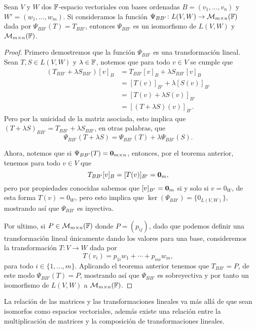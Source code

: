 \begin{teor}\label{teo:isomTrMat}
  Sean $V$ y $W$ dos $\mathbb{F}$-espacio vectoriales con bases ordenadas $B = (v_1,\ldots,v_n)$ y $W' = (w_1,\ldots,w_m)$. Si consideramos la función $\Psi_{BB'}\colon L(V,W) \to \mathcal{M}_{m\times n}(\mathbb{F})$ dada por $\Psi_{BB'}(T) = T_{BB'}$, entonces $\Psi_{BB'}$ es un isomorfismo de $L(V,W)$ y $\mathcal{M}_{m\times n}(\mathbb{F})$.
\end{teor}
\begin{proof}
  Primero demostremos que la función $\Psi_{BB'}$ es una transformación lineal. Sean $T, S \in L(V,W)$ y $\lambda \in \mathbb{F}$, notemos que para todo $v \in V$ se cumple que
  \begin{align*}
    (T_{BB'} + \lambda S_{BB'})[v]_B &= T_{BB'}[v]_B + \lambda S_{BB'} [v]_B \\
      &= [T(v)]_{B'} + \lambda [S(v)]_{B'} \\
      &= [T(v) + \lambda S(v)]_{B'} \\
      &= [ (T + \lambda S)(v)]_{B'}.
  \end{align*}
  Pero por la unicidad de la matriz asociada, esto implica que $(T + \lambda S)_{BB'} = T_{BB'} + \lambda S_{BB'}$, en otras palabras, que
  \[ \Psi_{BB'}(T + \lambda S) = \Psi_{BB'}(T) + \lambda \Psi_{BB'}(S). \]

  Ahora, notemos que si $\Psi_{BB'}(T) = \mathbf{0}_{m\times n}$, entonces, por el teorema anterior, tenemos para todo $v \in V$ que  
    \[ T_{BB'}[v]_B  = [T(v)]_{B'} = \mathbf{0}_m,\]
  pero por propiedades conocidas sabemos que $[v]_{B'} = \mathbf{0}_m$ si y solo si $v = 0_W$, de esta forma $T(v) = 0_W$, pero esto implica que $\ker(\Psi_{BB'}) = \{  0_{L(V,W)} \}$, mostrando así que $\Psi_{BB'}$ es inyectiva.

  Por ultimo, si $P \in \mathcal{M}_{m\times n}(\mathbb{F})$ donde $P = (p_{ij})$, dado que podemos definir una transformación lineal únicamente dando los valores para una base, consideremos la transformación $T\colon V \to W$ dada por
  \[ T(v_i) =  p_{1i}w_1 + \cdots + p_{mi}w_m, \]
  para todo $i \in \{1,\ldots,m\}$. Aplicando el teorema anterior tenemos que $T_{BB'} = P$, de este modo $\Psi_{BB'}(T) = P$, mostrando así que $\Psi_{BB'}$ es sobreyectiva y por tanto un isomorfismo de $L(V,W)$ a $\mathcal{M}_{m\times n}(\mathbb{F})$.
\end{proof}

La relación de las matrices y las transformaciones lineales va más allá de que sean isomorfos como espacios vectoriales, además existe una relación entre la multiplicación de matrices y la composición de transformaciones lineales.

